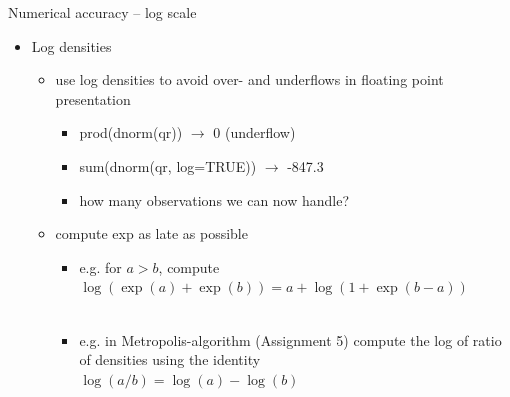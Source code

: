 \documentclass[finnish,english,t]{beamer}
\begin{document}
\begin{frame}{Numerical accuracy -- log scale}

  \begin{itemize}
  \item Log densities
    \begin{itemize}
    \item use log densities to avoid over- and underflows in floating
      point presentation
      \begin{itemize}
      \item {\color{navyblue} prod(dnorm(qr)) $\rightarrow$} {\color{red} 0 (underflow)}
      \item {\color{navyblue} sum(dnorm(qr, log=TRUE)) $\rightarrow$} {\color{darkgreen} -847.3}
      \item<2-> how many observations we can now handle? %
    \end{itemize}
    \item<3-> compute exp as late as possible
      \begin{itemize}
      \item<4-> e.g. for $a>b$, compute $\log(\exp(a)+\exp(b)) = a + \log(1+\exp(b-a))$\\
        \\
      \item<7-> e.g. in Metropolis-algorithm (Assignment 5) compute the log of ratio of densities using the identity\\
        $\log(a/b)=\log(a)-\log(b)$
    \end{itemize}
    \end{itemize}
  \end{itemize}

\end{frame}
\end{document}
